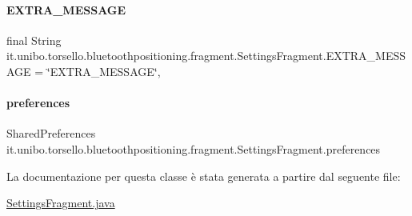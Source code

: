 \hypertarget{classit_1_1unibo_1_1torsello_1_1bluetoothpositioning_1_1fragment_1_1SettingsFragment_a3f3c627008cd1e176afc52642c73fd93_a3f3c627008cd1e176afc52642c73fd93}{}\label{classit_1_1unibo_1_1torsello_1_1bluetoothpositioning_1_1fragment_1_1SettingsFragment_a3f3c627008cd1e176afc52642c73fd93_a3f3c627008cd1e176afc52642c73fd93} 
\paragraph{\texorpdfstring{E\+X\+T\+R\+A\+\_\+\+M\+E\+S\+S\+A\+GE}{EXTRA\_MESSAGE}}
{\footnotesize\ttfamily final String it.\+unibo.\+torsello.\+bluetoothpositioning.\+fragment.\+Settings\+Fragment.\+E\+X\+T\+R\+A\+\_\+\+M\+E\+S\+S\+A\+GE = \char`\"{}E\+X\+T\+R\+A\+\_\+\+M\+E\+S\+S\+A\+GE\char`\"{}\hspace{0.3cm}{\ttfamily [static]}, {\ttfamily [private]}}

\hypertarget{classit_1_1unibo_1_1torsello_1_1bluetoothpositioning_1_1fragment_1_1SettingsFragment_a52480c4d5d81ca59fe4a98ae3c623ea4_a52480c4d5d81ca59fe4a98ae3c623ea4}{}\label{classit_1_1unibo_1_1torsello_1_1bluetoothpositioning_1_1fragment_1_1SettingsFragment_a52480c4d5d81ca59fe4a98ae3c623ea4_a52480c4d5d81ca59fe4a98ae3c623ea4} 
\paragraph{\texorpdfstring{preferences}{preferences}}
{\footnotesize\ttfamily Shared\+Preferences it.\+unibo.\+torsello.\+bluetoothpositioning.\+fragment.\+Settings\+Fragment.\+preferences\hspace{0.3cm}{\ttfamily [private]}}



La documentazione per questa classe è stata generata a partire dal seguente file\+:\begin{DoxyCompactItemize}
\item 
\hyperlink{SettingsFragment_8java}{Settings\+Fragment.\+java}\end{DoxyCompactItemize}
